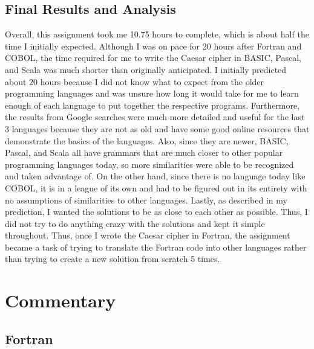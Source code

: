 \documentclass[letterpaper, 10pt, DIV=13]{scrartcl}
\numberwithin{equation}{section}
\numberwithin{figure}{section}
\numberwithin{table}{section}
\begin{document}
\subsection{Final Results and Analysis}
Overall, this assignment took me 10.75 hours to complete, which is about half the time I initially expected. Although I was on pace for 20 hours after Fortran and COBOL, the time required for me to write the Caesar cipher in BASIC, Pascal, and Scala was much shorter than originally anticipated. I initially predicted about 20 hours because I did not know what to expect from the older programming languages and was unsure how long it would take for me to learn enough of each language to put together the respective programs. Furthermore, the results from Google searches were much more detailed and useful for the last 3 languages because they are not as old and have some good online resources that demonstrate the basics of the languages. Also, since they are newer, BASIC, Pascal, and Scala all have grammars that are much closer to other popular programming languages today, so more similarities were able to be recognized and taken advantage of. On the other hand, since there is no language today like COBOL, it is in a league of its own and had to be figured out in its entirety with no assumptions of similarities to other languages. Lastly, as described in my prediction, I wanted the solutions to be as close to each other as possible. Thus, I did not try to do anything crazy with the solutions and kept it simple throughout. Thus, once I wrote the Caesar cipher in Fortran, the assignment became a task of trying to translate the Fortran code into other languages rather than trying to create a new solution from scratch 5 times.

\section{Commentary}
\subsection{Fortran}
\end{document}
